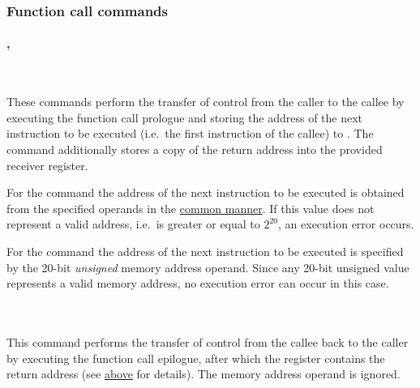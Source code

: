 \subsubsection{Function call commands}


\paragraph{, }\

These commands perform the transfer of control from the caller to the callee
by executing the function call prologue and storing the address
of the next instruction to be executed (i.e.\ the first instruction of the callee)
to .
The  command additionally stores a copy of the return address
into the provided receiver register.

For the  command the address of the next instruction to be executed
is obtained from the specified operands in the
\hyperlink{types:twos_complement}{common manner}.
If this value does not represent a valid address,
i.e.\ is greater or equal to $2^{20}$, an execution error occurs.

For the  command the address of the next instruction to be executed
is specified by the 20-bit \textit{unsigned} memory address operand.
Since any 20-bit unsigned value represents a valid memory address, no execution
error can occur in this case.


\vspace{-0.35cm}

\paragraph{}\

This command performs the transfer of control from the callee back to the caller
by executing the function call epilogue, after which the  register
contains the return address (see \hyperlink{functions:return}{above} for details).
The memory address operand is ignored.
